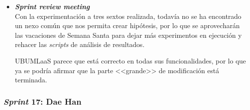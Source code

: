 \begin{itemize}
\item \textbf{\textit{Sprint review meeting}}\\
Con la experimentación a tres sextos realizada, todavía no se ha encontrado un nexo común que nos permita crear hipótesis, por lo que se aprovecharán las vacaciones de Semana Santa para dejar más experimentos en ejecución y rehacer las \textit{scripts} de análisis de resultados.

UBUMLaaS parece que está correcto en todas sus funcionalidades, por lo que ya se podría afirmar que la parte <<grande>> de modificación está terminada.

\end{itemize}

\subsubsection{\textit{Sprint} 17: Dae Han}
